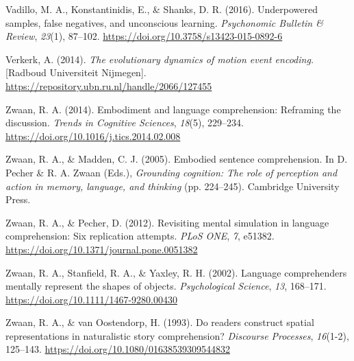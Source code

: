 \documentclass[
  man]{apa7}
\newlength{\cslhangindent}
\newlength{\cslentryspacingunit} %
\newenvironment{CSLReferences}[2] %
 {%
  \setlength{\parindent}{0pt}
  \ifodd #1
  \let\oldpar\par
  \def\par{\hangindent=\cslhangindent\oldpar}
  \fi
  \setlength{\parskip}{#2\cslentryspacingunit}
 }%
 {}
\begin{document}
\begin{CSLReferences}{1}{0}
\leavevmode{}%
Vadillo, M. A., Konstantinidis, E., \& Shanks, D. R. (2016). Underpowered samples, false negatives, and unconscious learning. \emph{Psychonomic Bulletin \& Review}, \emph{23}(1), 87--102. \url{https://doi.org/10.3758/s13423-015-0892-6}

\leavevmode{}%
Verkerk, A. (2014). \emph{The evolutionary dynamics of motion event encoding.} {[}{Radboud Universiteit Nijmegen}{]}. \url{https://repository.ubn.ru.nl/handle/2066/127455}

\leavevmode{}%
Zwaan, R. A. (2014). Embodiment and language comprehension: Reframing the discussion. \emph{Trends in Cognitive Sciences}, \emph{18}(5), 229--234. \url{https://doi.org/10.1016/j.tics.2014.02.008}

\leavevmode{}%
Zwaan, R. A., \& Madden, C. J. (2005). Embodied sentence comprehension. In D. Pecher \& R. A. Zwaan (Eds.), \emph{Grounding cognition: {The} role of perception and action in memory, language, and thinking} (pp. 224--245). {Cambridge University Press}.

\leavevmode{}%
Zwaan, R. A., \& Pecher, D. (2012). Revisiting mental simulation in language comprehension: Six replication attempts. \emph{PLoS ONE}, \emph{7}, e51382. \url{https://doi.org/10.1371/journal.pone.0051382}

\leavevmode{}%
Zwaan, R. A., Stanfield, R. A., \& Yaxley, R. H. (2002). Language comprehenders mentally represent the shapes of objects. \emph{Psychological Science}, \emph{13}, 168--171. \url{https://doi.org/10.1111/1467-9280.00430}

\leavevmode{}%
Zwaan, R. A., \& van Oostendorp, H. (1993). Do readers construct spatial representations in naturalistic story comprehension? \emph{Discourse Processes}, \emph{16}(1-2), 125--143. \url{https://doi.org/10.1080/01638539309544832}

\end{CSLReferences}

\endgroup
\end{document}
